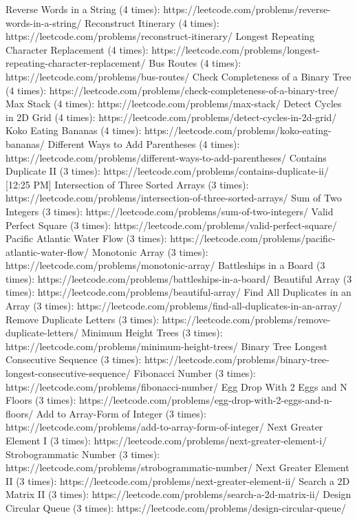 Reverse Words in a String (4 times): https://leetcode.com/problems/reverse-words-in-a-string/
Reconstruct Itinerary (4 times): https://leetcode.com/problems/reconstruct-itinerary/
Longest Repeating Character Replacement (4 times): https://leetcode.com/problems/longest-repeating-character-replacement/
Bus Routes (4 times): https://leetcode.com/problems/bus-routes/
Check Completeness of a Binary Tree (4 times): https://leetcode.com/problems/check-completeness-of-a-binary-tree/
Max Stack (4 times): https://leetcode.com/problems/max-stack/
Detect Cycles in 2D Grid (4 times): https://leetcode.com/problems/detect-cycles-in-2d-grid/
Koko Eating Bananas (4 times): https://leetcode.com/problems/koko-eating-bananas/
Different Ways to Add Parentheses (4 times): https://leetcode.com/problems/different-ways-to-add-parentheses/
Contains Duplicate II (3 times): https://leetcode.com/problems/contains-duplicate-ii/
[12:25 PM]
Intersection of Three Sorted Arrays (3 times): https://leetcode.com/problems/intersection-of-three-sorted-arrays/
Sum of Two Integers (3 times): https://leetcode.com/problems/sum-of-two-integers/
Valid Perfect Square (3 times): https://leetcode.com/problems/valid-perfect-square/
Pacific Atlantic Water Flow (3 times): https://leetcode.com/problems/pacific-atlantic-water-flow/
Monotonic Array (3 times): https://leetcode.com/problems/monotonic-array/
Battleships in a Board (3 times): https://leetcode.com/problems/battleships-in-a-board/
Beautiful Array (3 times): https://leetcode.com/problems/beautiful-array/
Find All Duplicates in an Array (3 times): https://leetcode.com/problems/find-all-duplicates-in-an-array/
Remove Duplicate Letters (3 times): https://leetcode.com/problems/remove-duplicate-letters/
Minimum Height Trees (3 times): https://leetcode.com/problems/minimum-height-trees/
Binary Tree Longest Consecutive Sequence (3 times): https://leetcode.com/problems/binary-tree-longest-consecutive-sequence/
Fibonacci Number (3 times): https://leetcode.com/problems/fibonacci-number/
Egg Drop With 2 Eggs and N Floors (3 times): https://leetcode.com/problems/egg-drop-with-2-eggs-and-n-floors/
Add to Array-Form of Integer (3 times): https://leetcode.com/problems/add-to-array-form-of-integer/
Next Greater Element I (3 times): https://leetcode.com/problems/next-greater-element-i/
Strobogrammatic Number (3 times): https://leetcode.com/problems/strobogrammatic-number/
Next Greater Element II (3 times): https://leetcode.com/problems/next-greater-element-ii/
Search a 2D Matrix II (3 times): https://leetcode.com/problems/search-a-2d-matrix-ii/
Design Circular Queue (3 times): https://leetcode.com/problems/design-circular-queue/
